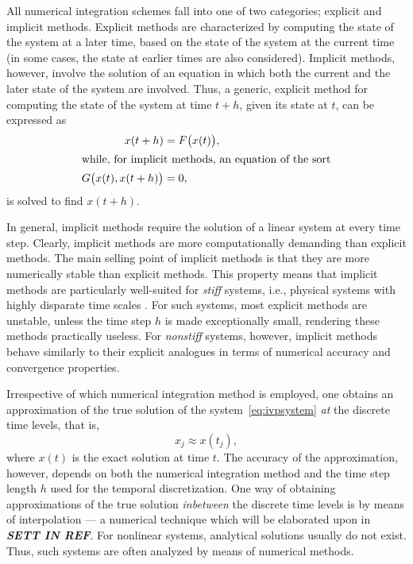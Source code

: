 All numerical integration schemes fall into one of two categories; explicit
and implicit methods. Explicit methods are characterized by computing the state
of the system at a later time, based on the state of the system at the current
time (in some cases, the state at earlier times are also considered). Implicit
methods, however, involve the solution of an equation in which both the
current and the later state of the system are involved. Thus, a generic,
explicit method for computing the state of the system at time $t+h$, given its
state at $t$, can be expressed as
\begin{subequations}
    \label{eq:exim}
    \begin{align}
        \label{eq:exim_ex}
        x(t+h) &= F\big(x(t)\big),\\
        \intertext{while, for implicit methods, an equation of the sort}
        \label{eq:exim_im}
        G\big(x(t),x(t+h)\big)&=0,
    \end{align}
\end{subequations}
is solved to find $x(t+h)$.

In general, implicit methods require the solution of a linear system at every
time step. Clearly, implicit methods are more computationally demanding than
explicit methods. The main selling point of implicit methods is that they are
more numerically stable than explicit methods. This property means that
implicit methods are particularly well-suited for \emph{stiff} systems, i.e.,
physical systems with highly disparate time scales
\parencite[p.2]{hairer1996solving}. For such systems, most explicit methods are
unstable, unless the time step $h$ is made exceptionally small, rendering these
methods practically useless. For \emph{nonstiff} systems, however, implicit
methods behave similarly to their explicit analogues in terms of numerical
accuracy and convergence properties.

Irrespective of which numerical integration method is employed, one obtains
an approximation of the true solution of the system~\eqref{eq:ivpsystem}
\emph{at} the discrete time levels, that is,
\begin{equation}
    \label{eq:num_int_approx_sol}
    x_{j} \approx x(t_{j}),
\end{equation}
where $x(t)$ is the exact solution at time $t$. The accuracy of the
approximation, however, depends on both the numerical integration method and
the time step length $h$ used for the temporal discretization. One way
of obtaining approximations of the true solution \emph{inbetween} the discrete
time levels is by means of interpolation --- a numerical technique which will
be elaborated upon in \textbf{\emph{SETT IN REF}}. For nonlinear systems,
analytical solutions usually do not exist. Thus, such systems are often
analyzed by means of numerical methods.
